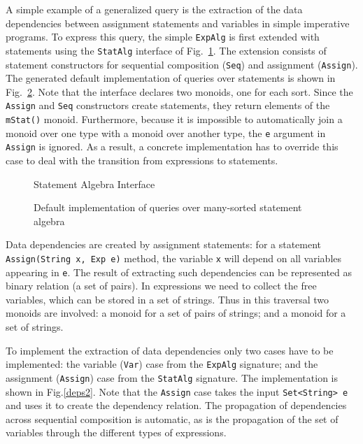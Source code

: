 A simple example of a generalized query is the extraction of the data
dependencies between assignment statements and variables in simple
imperative programs.  To express this query, the simple
\lstinline{ExpAlg} is first extended with statements using the
\lstinline{StatAlg} interface of Fig.~\ref{statalg}.  The extension
consists of statement constructors for sequential composition
(\lstinline{Seq}) and assignment (\lstinline{Assign}).  The generated
default implementation of queries over statements is shown in
Fig.~\ref{LST:gstatquery}.  Note that the interface declares two
monoids, one for each sort.  Since the \lstinline{Assign} and
\lstinline{Seq} constructors create statements, they return elements
of the \lstinline{mStat()} monoid.  Furthermore, because it is
impossible to automatically join a monoid over one type with a monoid
over another type, the \lstinline{e} argument in \lstinline{Assign}
is ignored.  As a result, a
concrete implementation has to override this case to deal with the
transition from expressions to statements.

\begin{figure}[t]
\vspace{-.1in}
\caption{Statement Algebra Interface}
\label{statalg}
\end{figure}


\begin{figure}[t]
\vspace{-.1in}
\caption{Default implementation of queries over many-sorted statement algebra}
\label{LST:gstatquery}
\end{figure}



Data dependencies are created by assignment statements: for a
statement \lstinline{Assign(String x, Exp e)} method, the variable
\lstinline{x} will depend on all variables appearing in \lstinline{e}.
The result of extracting such dependencies can be represented as
binary relation (a set of pairs). In expressions we need to collect
the free variables, which can be stored in a set of strings.  Thus in
this traversal two monoids are involved: a monoid for a set of pairs
of strings; and a monoid for a set of strings.

To implement the extraction of data dependencies only two cases have to
be implemented: the variable (\lstinline{Var}) case from the
\lstinline{ExpAlg} signature; and the assignment (\lstinline{Assign})
case from the \lstinline{StatAlg} signature.  The implementation is
shown in Fig.\ref{deps2}.  Note that the \lstinline{Assign} case takes
the input \lstinline{Set<String> e} and uses it to create the
dependency relation.  The propagation of dependencies across
sequential composition is automatic, as is the propagation of the set
of variables through the different types of expressions.


